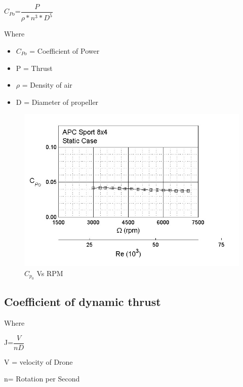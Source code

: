 $C_{Po}$=$\dfrac{P}{\rho*n^{3}*D^{5}}$

Where

\begin{itemize}
	
	\item  $C_{Po}$ = Coefficient of Power
	\item  P = Thrust
	\item  $\rho$ = Density of air
	\item  D = Diameter of propeller
	
	
	
\end{itemize} 





\begin{figure}[H]
	\centering
	\includegraphics[scale=.5]{graph1}
	\caption{$C_{p_{0}}$ Vs  RPM }
	\label{graph}
	
\end{figure}
\newpage

\subsection{Coefficient of dynamic thrust}

Where   

   J=$\dfrac{V}{nD}$
   
   V = velocity of Drone
   
   
   n= Rotation per Second
   



